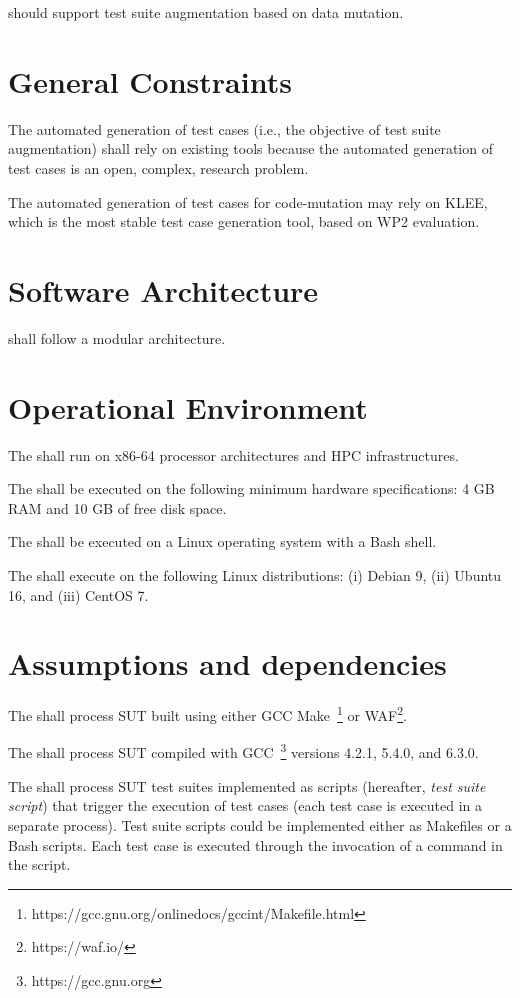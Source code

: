 \RQ{} \FAQAS should support test suite augmentation based on data mutation.


\section{General Constraints}

\RQ{} The automated generation of test cases (i.e., the objective of test suite augmentation) shall rely on existing tools because the automated generation of test cases is an open, complex, research problem.  

\RQ{} The automated generation of test cases for code-mutation may rely on KLEE, which is the most stable test case generation tool, based on WP2 evaluation.


\section{Software Architecture}

\RQ{} \FAQAS shall follow a modular architecture.

\section{Operational Environment}

\RQ{} The \FAQAS shall run on x86-64 processor architectures and HPC infrastructures.

\RQ{} The \FAQAS shall be executed on the following minimum hardware specifications: 4 GB RAM and 10 GB of free disk space.

\RQ{} The \FAQAS shall be executed on a Linux operating system with a Bash shell.

\RQ{} The \FAQAS shall execute on the following Linux distributions: (i) Debian 9, (ii) Ubuntu 16, and (iii) CentOS 7.

\section{Assumptions and dependencies}

\RQ{} The \FAQAS shall process SUT built using either GCC Make~\footnote{https://gcc.gnu.org/onlinedocs/gccint/Makefile.html} or WAF\footnote{https://waf.io/}.

\RQ{} The \FAQAS shall process SUT compiled with GCC~\footnote{https://gcc.gnu.org} versions 4.2.1, 5.4.0, and 6.3.0.

\RQ{} The \FAQAS shall process SUT test suites implemented as scripts (hereafter, \emph{test suite script}) that trigger the execution of test cases (each test case is executed in a separate process). Test suite scripts could be implemented either as Makefiles or a Bash scripts. Each test case is executed through the invocation of a command in the script.



